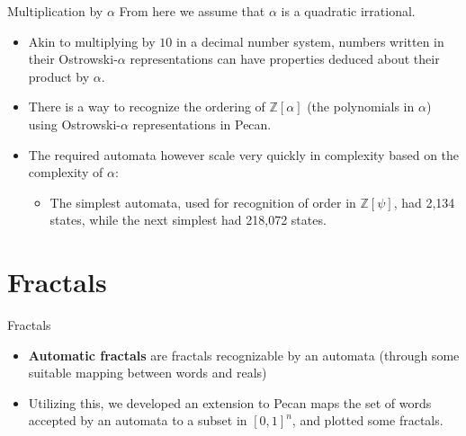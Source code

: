 \documentclass[leqno,presentation,usenames,dvipsnames]{beamer}
\begin{document}
\begin{frame}{Multiplication by $\alpha$}
    From here we assume that $\alpha$ is a quadratic irrational.
    \begin{itemize}
        \item Akin to multiplying by $10$ in a decimal number system, numbers written in their Ostrowski-$\alpha$ representations can have properties deduced about their product by $\alpha$.
    
        \item There is a way to recognize the ordering of $\mathbb Z [\alpha]$ (the polynomials in $\alpha$) using Ostrowski-$\alpha$ representations in Pecan.
        
        \item The required automata however scale very quickly in complexity based on the complexity of $\alpha$:
        \begin{itemize}
            \item The simplest automata, used for recognition of order in $\mathbb Z [\psi]$, had 2,134 states, while the next simplest had 218,072 states.
        \end{itemize}
        
        
    \end{itemize}
\end{frame}
    

\section{Fractals}
\begin{frame}{Fractals}
    \begin{itemize}
        \item \textbf{Automatic fractals} are fractals recognizable by an automata (through
        some suitable mapping between words and reals)
        \item Utilizing this,
        we developed an extension to Pecan maps the set of words accepted by
        an automata to a subset in $[0, 1]^n$, and plotted some fractals.
    \end{itemize}
\end{frame}
\end{document}
